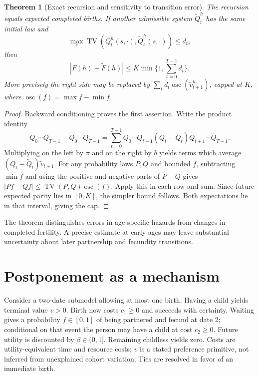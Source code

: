 \documentclass[11pt]{article}
\newtheorem{theorem}{Theorem}
\theoremstyle{remark}\newtheorem{remark}[theorem]{Remark}
\newcommand{\TV}{\operatorname{TV}}
\begin{document}
\begin{theorem}[Exact recursion and sensitivity to transition error]
The recursion equals expected completed births. If another admissible system $\widetilde Q_t^h$ has the same initial law and
\[
 \max_s\TV(Q_t^h(s,\cdot),\widetilde Q_t^h(s,\cdot))\le d_t,
\]
then
\[
 |F(h)-\widetilde F(h)|\le K\min\{1,\sum_{t=0}^{T-1}d_t\}.
\]
More precisely the right side may be replaced by
$\sum_t d_t\operatorname{osc}(\widetilde v_{t+1}^h)$, capped at $K$, where $\operatorname{osc}(f)=\max f-\min f$.
\end{theorem}
\begin{proof}
Backward conditioning proves the first assertion. Write the product identity
\[
 Q_0\cdots Q_{T-1}-\widetilde Q_0\cdots\widetilde Q_{T-1}
 =\sum_{t=0}^{T-1}Q_0\cdots Q_{t-1}(Q_t-\widetilde Q_t)
 \widetilde Q_{t+1}\cdots\widetilde Q_{T-1}.
\]
Multiplying on the left by $\pi$ and on the right by $b$ yields terms which average $(Q_t-\widetilde Q_t)\widetilde v_{t+1}$. For any probability laws $P,Q$ and bounded $f$, subtracting $\min f$ and using the positive and negative parts of $P-Q$ gives $|Pf-Qf|\le\TV(P,Q)\operatorname{osc}(f)$. Apply this in each row and sum. Since future expected parity lies in $[0,K]$, the simpler bound follows. Both expectations lie in that interval, giving the cap.
\end{proof}

The theorem distinguishes errors in age-specific hazards from changes in completed fertility. A precise estimate at early ages may leave substantial uncertainty about later partnership and fecundity transitions.

\section*{Postponement as a mechanism}
Consider a two-date submodel allowing at most one birth. Having a child yields terminal value $v>0$. Birth now costs $c_1\ge0$ and succeeds with certainty. Waiting gives a probability $f\in[0,1]$ of being partnered and fecund at date 2; conditional on that event the person may have a child at cost $c_2\ge0$. Future utility is discounted by $\beta\in(0,1]$. Remaining childless yields zero. Costs are utility-equivalent time and resource costs; $v$ is a stated preference primitive, not inferred from unexplained cohort variation. Ties are resolved in favor of an immediate birth.
\end{document}
